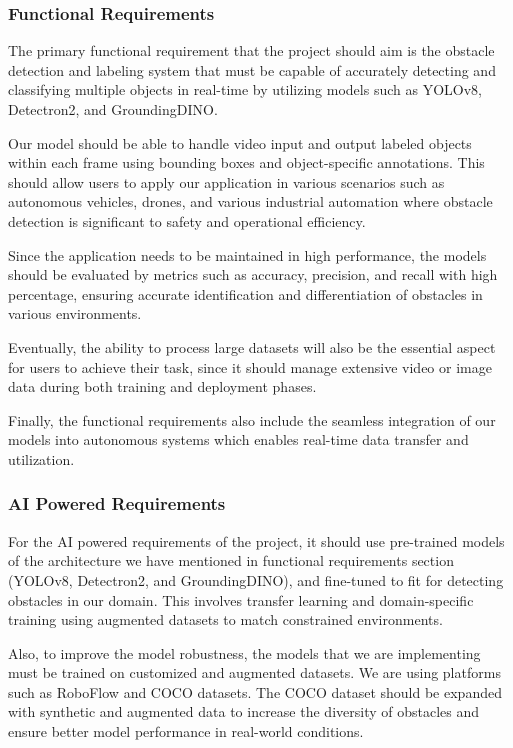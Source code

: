 \documentclass[stu,12pt,floatsintext]{apa7}
\begin{document}
\subsubsection{Functional Requirements}

The primary functional requirement that the project should aim is the obstacle detection and labeling system that must be capable of accurately detecting and classifying multiple objects in real-time by utilizing models such as YOLOv8, Detectron2, and GroundingDINO.

Our model should be able to handle video input and output labeled objects within each frame using bounding boxes and object-specific annotations. This should allow users to apply our application in various scenarios such as autonomous vehicles, drones, and various industrial automation where obstacle detection is significant to safety and operational efficiency. 

Since the application needs to be maintained in high performance, the models should be evaluated by metrics such as accuracy, precision, and recall with high percentage, ensuring accurate identification and differentiation of obstacles in various environments. 

Eventually, the ability to process large datasets will also be the essential aspect for users to achieve their task, since it should manage extensive video or image data during both training and deployment phases. 

Finally, the functional requirements also include the seamless integration of our models into autonomous systems which enables real-time data transfer and utilization. 

\subsubsection{AI Powered Requirements}

For the AI powered requirements of the project, it should use pre-trained models of the architecture we have mentioned in functional requirements section (YOLOv8, Detectron2, and GroundingDINO), and fine-tuned to fit for detecting obstacles in our domain. This involves transfer learning and domain-specific training using augmented datasets to match constrained environments. 

Also, to improve the model robustness, the models that we are implementing must be trained on customized and augmented datasets. We are using platforms such as RoboFlow and COCO datasets. The COCO dataset should be expanded with synthetic and augmented data to increase the diversity of obstacles and ensure better model performance in real-world conditions. 
\end{document}
